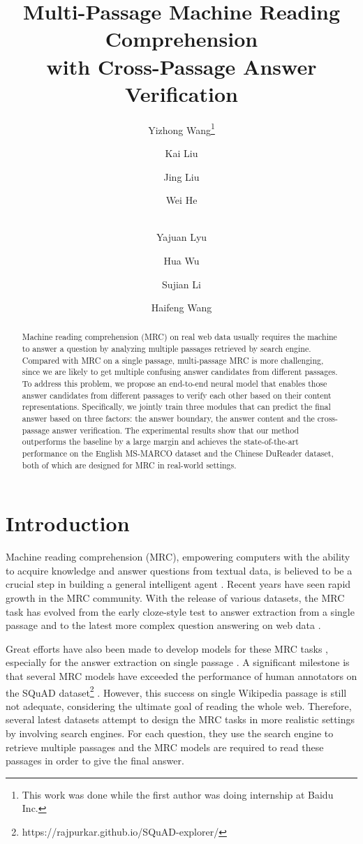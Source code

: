 \documentclass[11pt,a4paper]{article}
\title{Multi-Passage Machine Reading Comprehension \\ with Cross-Passage Answer Verification}
\author[1 *]{Yizhong Wang\thanks{\llap{\textsuperscript{*}}This work was done while the first author was doing internship at Baidu Inc.}}
\author[2]{Kai Liu}
\author[2]{Jing Liu}
\author[2]{Wei He}
\author[2]{\\Yajuan Lyu}
\author[2]{Hua Wu}
\author[1]{Sujian Li}
\author[2]{Haifeng Wang}
\affil[1]{Key Laboratory of Computational Linguistics, Peking University, MOE, China}
\affil[2]{Baidu Inc., Beijing, China}
\affil[ ]{\tt {\{yizhong, lisujian\}@pku.edu.cn, \{liukai20, liujing46, }}
\affil[ ]{\tt {hewei06, lvyajuan, wu\_hua, wanghaifeng\}@baidu.com}}
\date{}
\begin{document}
\maketitle

\begin{abstract}

Machine reading comprehension (MRC) on real web data usually requires the machine to answer a question by analyzing multiple passages retrieved by search engine. 
Compared with MRC on a single passage, multi-passage MRC is more challenging, since we are likely to get multiple confusing answer candidates from different passages.
To address this problem, we propose an end-to-end neural model that enables those answer candidates from different passages to verify each other based on their content representations.
Specifically, we jointly train three modules that can predict the final answer based on three factors: the answer boundary, the answer content and the cross-passage answer verification. 
The experimental results show that our method outperforms the baseline by a large margin and achieves the state-of-the-art performance on the English MS-MARCO dataset and the Chinese DuReader dataset, both of which are designed for MRC in real-world settings. 

\end{abstract}

\section{Introduction}
\label{introduction}







Machine reading comprehension (MRC), empowering computers with the ability to acquire knowledge and answer questions from textual data, is believed to be a crucial step in building a general intelligent agent \cite{cnn-dm-examination}. Recent years have seen rapid growth in the MRC community. With the release of various datasets, the MRC task has evolved from the early cloze-style test \cite{cnn-dm,cbt} to answer extraction from a single passage \cite{squad} and to the latest more complex question answering on web data \cite{marco, searchqa, dureader}. 

Great efforts have also been made to develop models for these MRC tasks 
, especially for the answer extraction on single passage \cite{match-lstm, bidaf, memen}. A significant milestone is that several MRC models have exceeded the performance of human annotators on the SQuAD dataset\footnote{https://rajpurkar.github.io/SQuAD-explorer/} \cite{squad}. However, this success on single Wikipedia passage is still not adequate, considering the ultimate goal of reading the whole web. Therefore, several latest datasets \cite{marco, dureader, searchqa} attempt to design the MRC tasks in more realistic settings by involving search engines. For each question, they use the search engine to retrieve multiple passages and the MRC models are required to read these passages in order to give the final answer.
\end{document}
